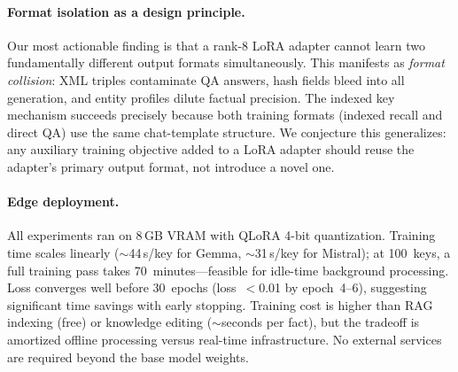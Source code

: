 \documentclass[11pt]{article}
\begin{document}
\paragraph{Format isolation as a design principle.}
Our most actionable finding is that a rank-8 LoRA adapter cannot learn two fundamentally different output formats simultaneously.
This manifests as \emph{format collision}: XML triples contaminate QA answers, hash fields bleed into all generation, and entity profiles dilute factual precision.
The indexed key mechanism succeeds precisely because both training formats (indexed recall and direct QA) use the same chat-template structure.
We conjecture this generalizes: any auxiliary training objective added to a LoRA adapter should reuse the adapter's primary output format, not introduce a novel one.

\paragraph{Edge deployment.}
All experiments ran on 8\,GB VRAM with QLoRA 4-bit quantization.
Training time scales linearly ($\sim$44\,s/key for Gemma, $\sim$31\,s/key for Mistral); at 100~keys, a full training pass takes 70~minutes---feasible for idle-time background processing.
Loss converges well before 30~epochs (loss~$<$0.01 by epoch~4--6), suggesting significant time savings with early stopping.
Training cost is higher than RAG indexing (free) or knowledge editing ($\sim$seconds per fact), but the tradeoff is amortized offline processing versus real-time infrastructure.
No external services are required beyond the base model weights.
\end{document}
